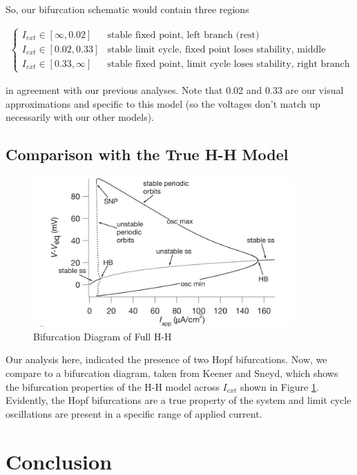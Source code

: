\documentclass{article}
\begin{document}
So, our bifurcation schematic would contain three regions

\begin{align*}
    \begin{cases}
    I_{ext} \in [\infty, 0.02] & \text{stable fixed point, left branch (rest)} \\
    I_{ext} \in [0.02, 0.33] &  \text{stable limit cycle, fixed point loses stability, middle branch} \\
    I_{ext} \in [0.33, \infty] & \text{stable fixed point, limit cycle loses stability, right branch (excited)}
    \end{cases}
\end{align*}

in agreement with our previous analyses. Note that 0.02 and 0.33 are our visual approximations and specific to this model (so the voltages don't match up necessarily with our other models). 

\subsection{Comparison with the True H-H Model}

\begin{figure}
\centering
	\centering
	\includegraphics[width=10cm]{true.png}
	\caption{Bifurcation Diagram of Full H-H\cite{keener}}
	\label{fig:big_keen}
\end{figure}

Our analysis here, indicated the presence of two Hopf bifurcations. Now, we compare to a bifurcation diagram, taken from Keener and Sneyd, which shows the bifurcation properties of the H-H model across $I_{ext}$ shown in Figure \ref{fig:big_keen}. Evidently, the Hopf bifurcations are a true property of the system and limit cycle oscillations are present in a specific range of applied current. 

\section{Conclusion}
\end{document}
